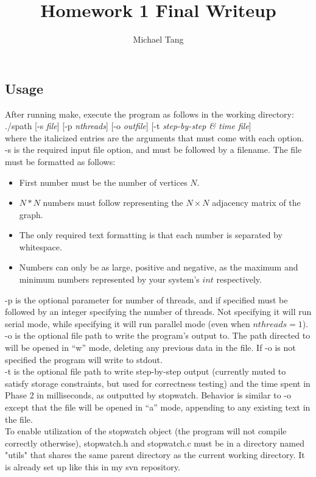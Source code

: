\documentclass{article}
\title{Homework 1 Final Writeup}
\author{Michael Tang}
\begin{document}
\maketitle
{}
\begin{adjustwidth}{-2cm}{-2cm}

\section{Usage}
After running make, execute the program as follows in the working directory:\\
./spath [-s \textit{file}] [-p \textit{nthreads}] [-o \textit{outfile}] [-t \textit{step-by-step \& time file}]\\
where the italicized entries are the arguments that must come with each option.\\
-s is the required input file option, and must be followed by a filename. The file must be formatted as follows:
\begin{itemize}
	\item First number must be the number of vertices $N$.
	\item $N*N$ numbers must follow representing the $N \times N$ adjacency matrix of the graph.
	\item The only required text formatting is that each number is separated by whitespace.
	\item Numbers can only be as large, positive and negative, as the maximum and minimum numbers represented by your system's $int$ respectively.
\end{itemize}
-p is the optional parameter for number of threads, and if specified must be followed by an integer specifying the number of threads. Not specifying it will run serial mode, while specifying it will run parallel mode (even when $nthreads = 1$).\\
-o is the optional file path to write the program's output to. The path directed to will be opened in ``w'' mode, deleting any previous data in the file. If -o is not specified the program will write to stdout.\\
-t is the optional file path to write step-by-step output (currently muted to satisfy storage constraints, but used for correctness testing) and the time spent in Phase 2 in milliseconds, as outputted by stopwatch. Behavior is similar to -o except that the file will be opened in ``a'' mode, appending to any existing text in the file.\\
To enable utilization of the stopwatch object (the program will not compile correctly otherwise), stopwatch.h and stopwatch.c must be in a directory named "utils" that shares the same parent directory as the current working directory. It is already set up like this in my svn repository.


\end{adjustwidth}
\end{document}
